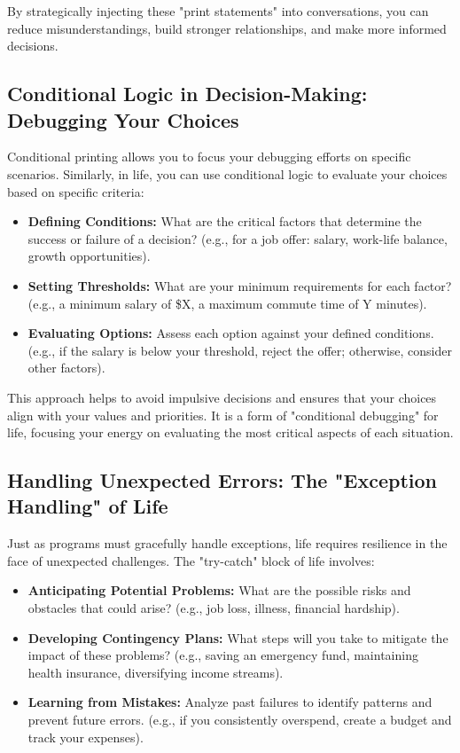 \documentclass{article}
\begin{document}
{{{{By strategically injecting these "print statements" into conversations, you can reduce misunderstandings, build stronger relationships, and make more informed decisions.

\subsection*{Conditional Logic in Decision-Making: Debugging Your Choices}

Conditional printing allows you to focus your debugging efforts on specific scenarios. Similarly, in life, you can use conditional logic to evaluate your choices based on specific criteria:

\begin{itemize}
    \item \textbf{Defining Conditions:} What are the critical factors that determine the success or failure of a decision? (e.g., for a job offer: salary, work-life balance, growth opportunities).
    \item \textbf{Setting Thresholds:} What are your minimum requirements for each factor? (e.g., a minimum salary of \$X, a maximum commute time of Y minutes).
    \item \textbf{Evaluating Options:} Assess each option against your defined conditions. (e.g., if the salary is below your threshold, reject the offer; otherwise, consider other factors).
\end{itemize}

This approach helps to avoid impulsive decisions and ensures that your choices align with your values and priorities. It is a form of "conditional debugging" for life, focusing your energy on evaluating the most critical aspects of each situation.

\subsection*{Handling Unexpected Errors: The "Exception Handling" of Life}

Just as programs must gracefully handle exceptions, life requires resilience in the face of unexpected challenges. The "try-catch" block of life involves:

\begin{itemize}
    \item \textbf{Anticipating Potential Problems:} What are the possible risks and obstacles that could arise? (e.g., job loss, illness, financial hardship).
    \item \textbf{Developing Contingency Plans:} What steps will you take to mitigate the impact of these problems? (e.g., saving an emergency fund, maintaining health insurance, diversifying income streams).
    \item \textbf{Learning from Mistakes:} Analyze past failures to identify patterns and prevent future errors. (e.g., if you consistently overspend, create a budget and track your expenses).
\end{itemize}

}}}}
\end{document}
